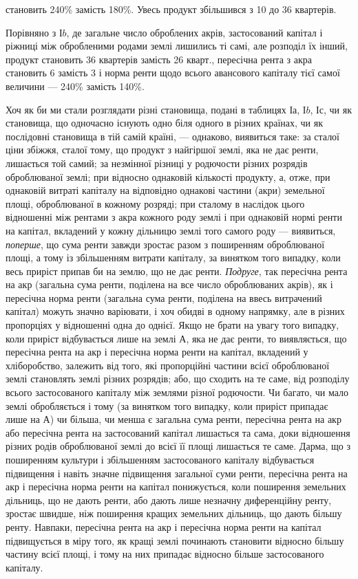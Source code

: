 \parcont{}  %
становить 240\% замість 180\%. Увесь продукт збільшився з 10 до
36 квартерів.

Порівняно з І$b$, де загальне число оброблених акрів, застосований капітал
і ріжниці між обробленими родами землі лишились ті самі, але розподіл
їх інший, продукт становить 36 квартерів замість 26 кварт., пересічна рента
з акра становить 6 замість 3 і норма ренти щодо всього авансового
капіталу тієї самої величини — 240\% замість 140\%.

Хоч як би ми стали розглядати різні становища, подані в таблицях І$а$,
І$b$, І$с$, чи як становища, що одночасно існують одно біля одного в різних країнах,
чи як послідовні становища в тій самій країні, — однаково, виявиться таке:
за сталої ціни збіжжя, сталої тому, що продукт з найгіршої землі, яка не дає
ренти, лишається той самий; за незмінної різниці у родючости різних розрядів
оброблюваної землі; при відносно однаковій кількості продукту, а, отже,
при однаковій витраті капіталу на відповідно однакові частини (акри) земельної
площі, оброблюваної в кожному розряді; при сталому в наслідок цього
відношенні між рентами з акра кожного роду землі і при однаковій нормі ренти
на капітал, вкладений у кожну дільницю землі того самого роду — виявиться,
\emph{поперше}, що сума ренти завжди зростає разом з поширенням оброблюваної
площі, а тому із збільшенням витрати капіталу, за винятком того випадку, коли
весь приріст припав би на землю, що не дає ренти. \emph{Подруге}, так пересічна
рента на акр (загальна сума ренти, поділена на все число оброблюваних
акрів), як і пересічна норма ренти (загальна сума ренти, поділена на ввесь
витрачений капітал) можуть значно варіювати, і хоч обидві в одному напрямку,
але в різних пропорціях у відношенні одна до однієї. Якщо не брати
на увагу того випадку, коли приріст відбувається лише на землі $А$,
яка не дає ренти, то виявляється, що пересічна рента на акр і пересічна
норма ренти на капітал, вкладений у хліборобство, залежить від того, які пропорційні
частини всієї оброблюваної землі становлять землі різних розрядів;
або, що сходить на те саме, від розподілу всього застосованого капіталу між
землями різної родючости. Чи багато, чи мало землі обробляється і тому (за
винятком того випадку, коли приріст припадає лише на $А$) чи більша, чи
менша є загальна сума ренти, пересічна рента на акр або пересічна рента на
застосований капітал лишається та сама, доки відношення різних родів оброблюваної
землі до всієї її площі лишається те саме. Дарма, що з поширенням
культури і збільшенням застосованого капіталу відбувається підвищення і
навіть значне підвищення загальної суми ренти, пересічна рента на акр і
пересічна норма ренти на капітал понижується, коли поширення земельних
дільниць, що не дають ренти, або дають лише незначну диференційну ренту,
зростає швидше, ніж поширення кращих земельних дільниць, що дають більшу
ренту. Навпаки, пересічна рента на акр і пересічна норма ренти на капітал підвищується в міру того,
як кращі землі починають становити відносно більшу
частину всієї площі, і тому на них припадає відносно більше застосованого
капіталу.

